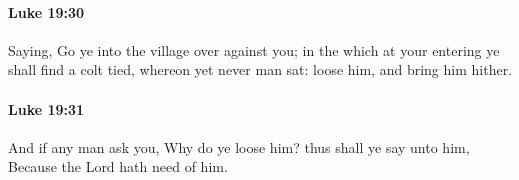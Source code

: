 		\paragraph{Luke 19:30} %
			\label{LUKE-19-30}

			Saying, Go ye into the village over against you; in the which at your entering ye shall find a colt tied, whereon yet never man sat: loose him, and bring him hither.

			\begin{framed}
			\scriptsize
				\begin{compactdesc}
					\item[SBLG] 
				\end{compactdesc}
			\end{framed}

		\paragraph{Luke 19:31} %
			\label{LUKE-19-31}

			And if any man ask you, Why do ye loose him? thus shall ye say unto him, Because the Lord hath need of him.

